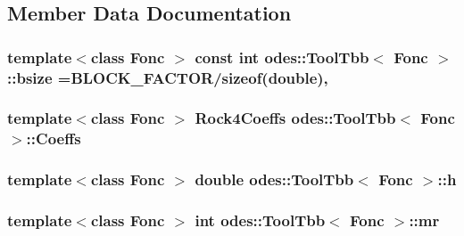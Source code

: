 \subsection{Member Data Documentation}
\hypertarget{classodes_1_1ToolTbb_a27a5da88ed795805c407db7d2afc0626}{
\subsubsection[{bsize}]{\setlength{\rightskip}{0pt plus 5cm}template$<$class Fonc $>$ const int {\bf odes\-::\-Tool\-Tbb}$<$ Fonc $>$\-::bsize ={\bf B\-L\-O\-C\-K\-\_\-\-F\-A\-C\-T\-O\-R}/sizeof(double)\hspace{0.3cm}{\ttfamily [static]}, {\ttfamily [private]}}}\label{classodes_1_1ToolTbb_a27a5da88ed795805c407db7d2afc0626}
\hypertarget{classodes_1_1ToolTbb_aa4d2b275599d8eb1d8e2f9ab6cb9b3a9}{
\subsubsection[{Coeffs}]{\setlength{\rightskip}{0pt plus 5cm}template$<$class Fonc $>$ {\bf Rock4\-Coeffs} {\bf odes\-::\-Tool\-Tbb}$<$ Fonc $>$\-::Coeffs\hspace{0.3cm}{\ttfamily [private]}}}\label{classodes_1_1ToolTbb_aa4d2b275599d8eb1d8e2f9ab6cb9b3a9}
\hypertarget{classodes_1_1ToolTbb_aa9b6605c14ba2b50561ed7bea5c6b8e4}{
\subsubsection[{h}]{\setlength{\rightskip}{0pt plus 5cm}template$<$class Fonc $>$ double {\bf odes\-::\-Tool\-Tbb}$<$ Fonc $>$\-::h\hspace{0.3cm}{\ttfamily [private]}}}\label{classodes_1_1ToolTbb_aa9b6605c14ba2b50561ed7bea5c6b8e4}
\hypertarget{classodes_1_1ToolTbb_a4d0df7852c635e872bf45b71120f95ae}{
\subsubsection[{mr}]{\setlength{\rightskip}{0pt plus 5cm}template$<$class Fonc $>$ int {\bf odes\-::\-Tool\-Tbb}$<$ Fonc $>$\-::mr\hspace{0.3cm}{\ttfamily [private]}}}\label{classodes_1_1ToolTbb_a4d0df7852c635e872bf45b71120f95ae}
